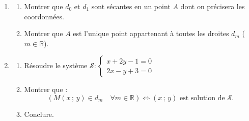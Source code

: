 \documentclass[11pt,a4paper]{article}
\newcommand{\R}{\mathbb{R}}
\begin{document}
\begin{enumerate}
    \item 
    \begin{enumerate}
        \item Montrer que $d_0$ et $d_1$ sont sécantes en un point $A$ dont on précisera les coordonnées.
        \item Montrer que $A$ est l'unique point appartenant à toutes les droites $d_m$ ($m \in \R$).
    \end{enumerate}
    \item 
    \begin{enumerate}
        \item Résoudre le système $\mathscr{S} : \begin{cases} x + 2y - 1 = 0 \\ 2x - y + 3 = 0 \end{cases}$
        \item Montrer que :
        \[
        (M(x\,;\,y) \in d_m \quad \forall m \in \R) \iff (x\,;\,y) \text{ est solution de } \mathscr{S}.
        \]
        \item Conclure.
    \end{enumerate}
\end{enumerate}
\end{document}
